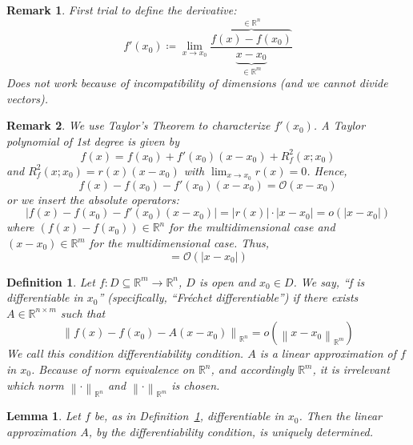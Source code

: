 \documentclass{article}
\newtheorem{definition}{Definition}  \numberwithin{definition}{section}
\newtheorem{lemma}{Lemma}  \numberwithin{lemma}{section}
\newtheorem{remark}{Remark}  \numberwithin{remark}{section}
\newcommand{\norm}[1]{\left\|#1\right\|}
\newcommand{\card}[1]{\left|#1\right|}
\begin{document}
\begin{remark}
  First trial to define the derivative:
  \[ f'(x_0) \coloneqq \lim_{x\to x_0} \frac{\overbrace{f(x) - f(x_0)}^{\in \mathbb R^n}}{\underbrace{x - x_0}_{\in \mathbb R^m}} \]
  Does not work because of incompatibility of dimensions (and we cannot divide vectors).
\end{remark}

\begin{remark}
  We use Taylor's Theorem to characterize $f'(x_0)$. A Taylor polynomial of 1st degree is given by
  \[ f(x) = f(x_0) + f'(x_0) (x - x_0) + R_f^2(x; x_0) \]
  and $R_f^2(x; x_0) = r(x) (x - x_0)$ with $\lim_{x\to x_0} r(x) = 0$.
  Hence,
  \[ f(x) - f(x_0) - f'(x_0)(x - x_0) = \mathcal O(x - x_0) \]
  or we insert the absolute operators:
  \[ \card{f(x) - f(x_0) - f'(x_0) (x - x_0)} = \card{r(x)} \cdot \card{x - x_0} = o(\card{x - x_0}) \]
  where $(f(x) - f(x_0)) \in \mathbb R^n$ for the multidimensional case
  and $(x - x_0) \in \mathbb R^m$ for the multidimensional case. Thus,
  \[ = \mathcal O(\card{x - x_0}) \]
\end{remark}

\begin{definition} %
  \label{defp}
  Let $f: D \subseteq \mathbb R^m \to \mathbb R^n$, $D$ is open and $x_0 \in D$.
  We say, \enquote{f is differentiable in $x_0$} (specifically, \enquote{Fr\'echet differentiable})
  if there exists $A \in \mathbb R^{n \times m}$ such that
  \[ \norm{f(x) - f(x_0) - A(x - x_0)}_{\mathbb R^n} = o(\norm{x - x_0}_{\mathbb R^m}) \]
  We call this condition \emph{differentiability condition}.
  $A$ is a linear approximation of $f$ in $x_0$.
  Because of norm equivalence on $\mathbb R^n$, and accordingly $\mathbb R^m$,
  it is irrelevant which norm $\norm{\cdot}_{\mathbb R^n}$ and $\norm{\cdot}_{\mathbb R^m}$ is chosen.
\end{definition}

\begin{lemma} %
  Let $f$ be, as in Definition~\ref{defp}, differentiable in $x_0$.
  Then the linear approximation $A$, by the differentiability condition, is uniquely determined.
\end{lemma}
\end{document}
